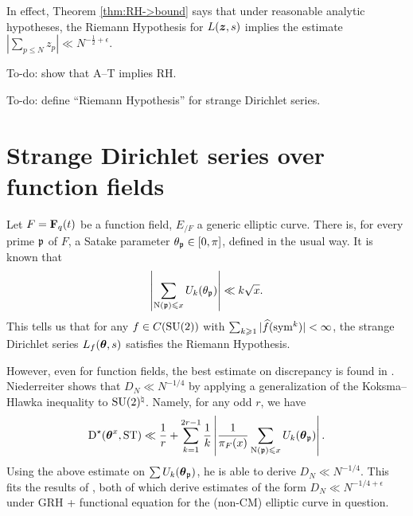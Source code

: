 In effect, Theorem \ref{thm:RH->bound} says that under reasonable analytic 
hypotheses, the Riemann Hypothesis for $L({\boldsymbol z},s)$ implies the estimate 
$|\sum_{p\leqslant N} z_p| \ll N^{-\frac 1 2+\epsilon}$. 

To-do: show that A--T implies RH. 

To-do: define ``Riemann Hypothesis'' for strange Dirichlet series. 





\section{Strange Dirichlet series over function fields}

Let $F = \mathbf{F}_q(t)$ be a function field, $E_{/F}$ a generic elliptic curve. 
There is, for every prime $\mathfrak{p}$ of $F$, a Satake parameter 
$\theta_{\mathfrak{p}} \in [0,\pi]$, defined in the usual way. It is known 
\cite[Ch.~3]{katz-1988} that
\[
	\left|\sum_{\operatorname{N}(\mathfrak{p}) \leqslant x} U_k(\theta_{\mathfrak{p}}) \right| \ll k \sqrt{x} .
\]
This tells us that for any $f\in C(\operatorname{SU}(2))$ with 
$\sum_{k\geqslant 1} |\widehat f(\operatorname{sym}^k)|<\infty$, the strange Dirichlet 
series $L_f({\boldsymbol\theta},s)$ satisfies the Riemann Hypothesis. 

However, even for function fields, the best estimate on discrepancy is found in 
\cite{niederreiter-1991}. Niederreiter shows that 
$D_N \ll N^{-1/4}$ by applying a generalization of the Koksma--Hlawka 
inequality to $\operatorname{SU}(2)^\natural$. Namely, for any odd $r$, we have 
\[
	\operatorname{D}^\star({\boldsymbol\theta}^x,\mathrm{ST}) \ll \frac 1 r + \sum_{k=1}^{2 r -1} \frac 1 k \left| \frac{1}{\pi_F(x)} \sum_{\operatorname{N}(\mathfrak{p})\leqslant x} U_k({\boldsymbol\theta}_{\mathfrak{p}})\right| .
\]
Using the above estimate on $\sum U_k({\boldsymbol\theta}_{\mathfrak{p}})$, he is able to derive 
$D_N \ll N^{-1/4}$. This fits the results of 
\cite{bucar-kedlaya-2015,rouse-thorner-2016}, both of which derive estimates 
of the form $D_N \ll N^{-1/4+\epsilon}$ under GRH + functional equation for 
the (non-CM) elliptic curve in question. 
